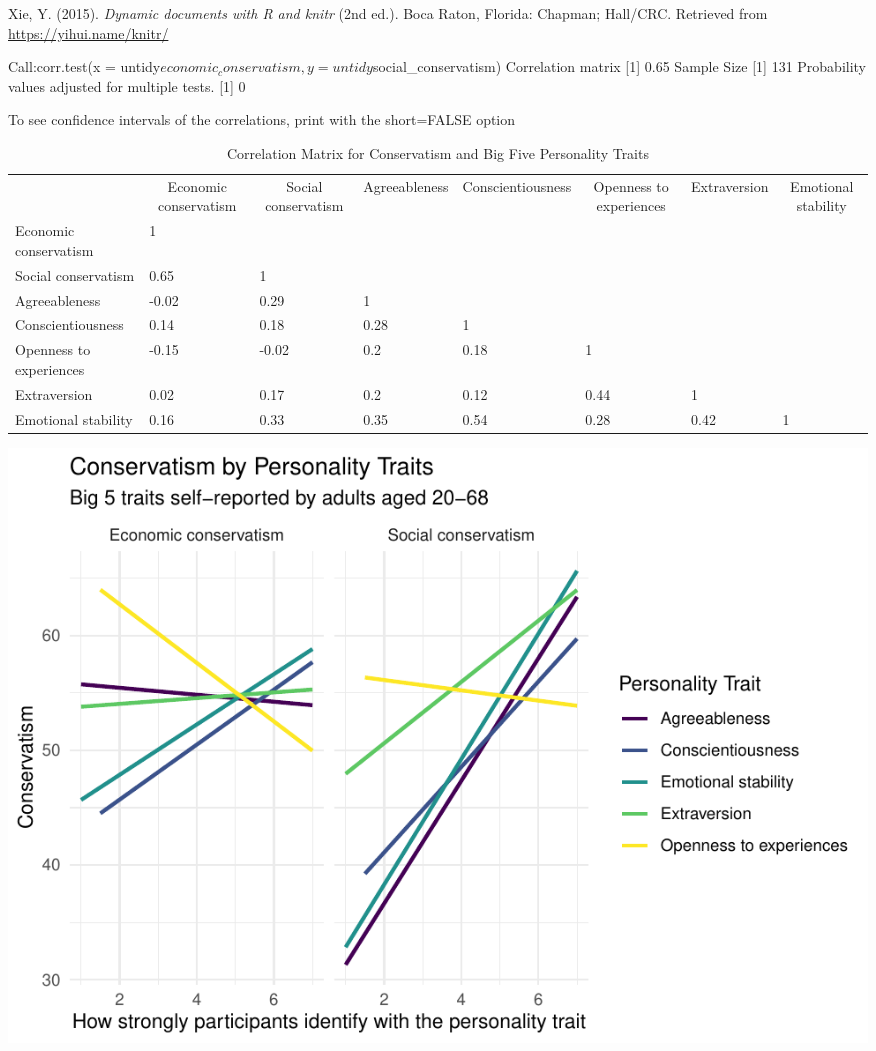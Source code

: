 \documentclass[man]{apa6}
\makeatletter
\newenvironment{lltable}{\begin{landscape}\begin{center}\begin{ThreePartTable}}{\end{ThreePartTable}\end{center}\end{landscape}}
\newcommand\LastLTentrywidth{1em}
\newlength\longtablewidth
\newcommand{\getlongtablewidth}{\begingroup \ifcsname LT@\roman{LT@tables}\endcsname \global\longtablewidth=0pt \renewcommand{\LT@entry}[2]{\global\advance\longtablewidth by ##2\relax\gdef\LastLTentrywidth{##2}}\@nameuse{LT@\roman{LT@tables}} \fi \endgroup}
\makeatother
\begin{document}
\leavevmode\hypertarget{ref-R-knitr}{}%
Xie, Y. (2015). \emph{Dynamic documents with R and knitr} (2nd ed.). Boca Raton, Florida: Chapman; Hall/CRC. Retrieved from \url{https://yihui.name/knitr/}

Call:corr.test(x = untidy\(economic_conservatism, y = untidy\)social\_conservatism)
Correlation matrix
{[}1{]} 0.65
Sample Size
{[}1{]} 131
Probability values adjusted for multiple tests.
{[}1{]} 0

To see confidence intervals of the correlations, print with the short=FALSE option

\begin{lltable}


\tiny{
\begin{longtable}{llllllll}\noalign{\getlongtablewidth\global\LTcapwidth=\longtablewidth}
\caption{\label{tab:correlations}Correlation Matrix for Conservatism and Big Five Personality Traits}\\
\toprule
 & \multicolumn{1}{c}{Economic conservatism} & \multicolumn{1}{c}{Social conservatism} & \multicolumn{1}{c}{Agreeableness} & \multicolumn{1}{c}{Conscientiousness} & \multicolumn{1}{c}{Openness to experiences} & \multicolumn{1}{c}{Extraversion} & \multicolumn{1}{c}{Emotional stability}\\
\midrule
Economic conservatism & 1 &  &  &  &  &  & \\
Social conservatism & 0.65 & 1 &  &  &  &  & \\
Agreeableness & -0.02 & 0.29 & 1 &  &  &  & \\
Conscientiousness & 0.14 & 0.18 & 0.28 & 1 &  &  & \\
Openness to experiences & -0.15 & -0.02 & 0.2 & 0.18 & 1 &  & \\
Extraversion & 0.02 & 0.17 & 0.2 & 0.12 & 0.44 & 1 & \\
Emotional stability & 0.16 & 0.33 & 0.35 & 0.54 & 0.28 & 0.42 & 1\\
\bottomrule
\end{longtable}
}
\end{lltable}

\includegraphics{manuscript_files/figure-latex/figure1-1.pdf}
\end{document}
